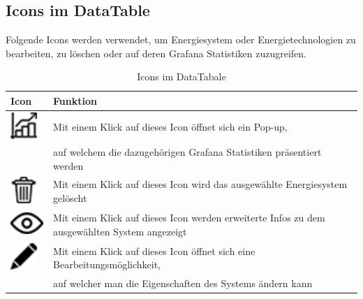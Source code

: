 \newpage
\subsection{Icons im DataTable}
Folgende Icons werden  verwendet, um Energiesystem oder Energietechnologien zu bearbeiten, zu löschen oder auf deren Grafana Statistiken zuzugreifen.
\begin{table}[h]
	\begin{tabular}{|l|l|}
		\hline
		Icon & Funktion                                                                                     \\ \hline
			\includegraphics[height=1cm,width=1cm]{images/Icons/statistik}& Mit einem Klick auf dieses Icon öffnet sich ein Pop-up,\\& auf welchem die dazugehörigen  Grafana Statistiken präsentiert werden       \\ \hline
			\includegraphics[height=1cm,width=1cm]{images/Icons/delete}  & Mit einem Klick auf dieses Icon wird das ausgewählte Energiesystem gelöscht                  \\ \hline
			\includegraphics[height=1cm,width=1.5cm]{images/Icons/auge} & Mit einem Klick auf dieses Icon werden erweiterte Infos zu dem ausgewählten System angezeigt \\ \hline
			\includegraphics[height=1cm,width=1cm]{images/Icons/stift} & Mit einem Klick auf dieses Icon öffnet sich eine Bearbeitungsmöglichkeit,\\& auf welcher man die Eigenschaften des Systems ändern kann \\ \hline
	\end{tabular}
	\caption{Icons im DataTabale}
\label{tab: Icons im DataTabales}
\end{table}

